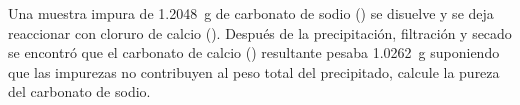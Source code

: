 Una muestra impura de \SI{1,2048}{\gram} de carbonato de sodio () se disuelve y se deja reaccionar con cloruro de calcio (). Después de la precipitación, filtración y secado se encontró que el carbonato de calcio () resultante pesaba \SI{1,0262}{\gram} suponiendo que las impurezas no contribuyen al peso total del precipitado, calcule la pureza del carbonato de sodio.
